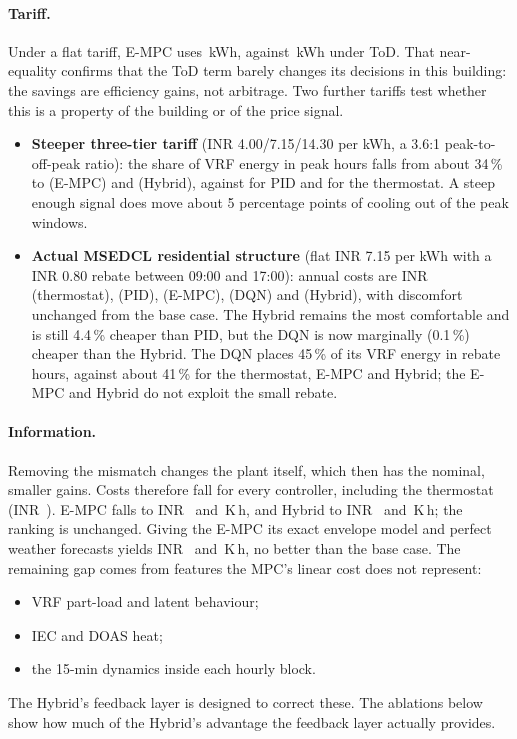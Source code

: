 \paragraph{Tariff.}
Under a flat tariff, E-MPC uses \SFlatEMpc\,kWh, against \SBaseEMpc\,kWh under ToD. That
near-equality confirms that the ToD term barely changes its decisions in this building:
the savings are efficiency gains, not arbitrage. Two further tariffs test whether this
is a property of the building or of the price signal.
\begin{itemize}
  \item \textbf{Steeper three-tier tariff} (INR 4.00/7.15/14.30 per kWh, a 3.6:1
        peak-to-off-peak ratio): the share of VRF energy in peak hours falls from about
        34\,\% to \SSteepPkShMpc{} (E-MPC) and \SSteepPkShHyb{} (Hybrid), against
        \SSteepPkShPid{} for PID and \SSteepPkShTh{} for the thermostat. A steep enough
        signal does move about 5 percentage points of cooling out of the peak windows.
  \item \textbf{Actual MSEDCL residential structure} (flat INR 7.15 per kWh with a
        INR 0.80 rebate between 09:00 and 17:00): annual costs are INR~\SMsedclCostTh{}
        (thermostat), \SMsedclCostPid{} (PID), \SMsedclCostMpc{} (E-MPC),
        \SMsedclCostDqn{} (DQN) and \SMsedclCostHyb{} (Hybrid), with discomfort
        unchanged from the base case. The Hybrid remains the most comfortable and is
        still 4.4\,\% cheaper than PID, but the DQN is now marginally (0.1\,\%)
        cheaper than the Hybrid. The DQN places 45\,\% of its VRF energy in rebate hours,
        against about 41\,\% for the thermostat, E-MPC and Hybrid; the E-MPC and Hybrid
        do not exploit the small rebate.
\end{itemize}

\paragraph{Information.}
Removing the mismatch changes the plant itself, which then has the nominal, smaller
gains. Costs therefore fall for every controller, including the thermostat
(INR~\SNoMisCostTh). E-MPC falls to INR~\SNoMisCostMpc{} and \SNoMisKhMpc\,K\,h, and
Hybrid to INR~\SNoMisCostHyb{} and \SNoMisKhHyb\,K\,h; the ranking is unchanged. Giving the E-MPC its exact envelope model and perfect weather forecasts
yields INR~\SPerfCostMpc{} and \SPerfKhMpc\,K\,h, no better than the base case. The
remaining gap comes from features the MPC's linear cost does not represent:
\begin{itemize}
  \item VRF part-load and latent behaviour;
  \item IEC and DOAS heat;
  \item the 15-min dynamics inside each hourly block.
\end{itemize}
The Hybrid's feedback layer is designed to correct these. The ablations below show how
much of the Hybrid's advantage the feedback layer actually provides.

